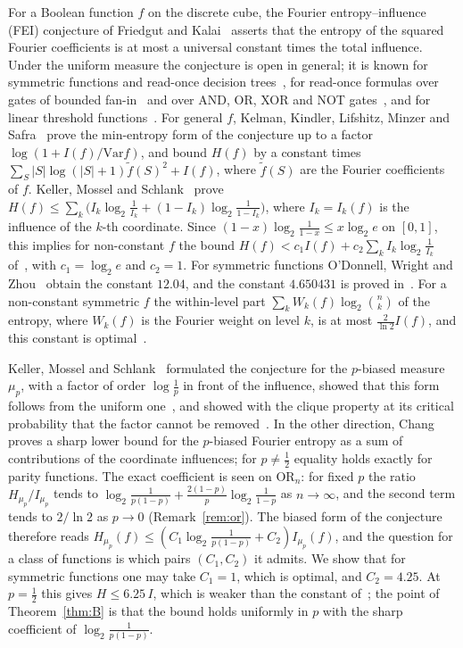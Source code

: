 \documentclass[11pt]{amsart}
\theoremstyle{remark}
\newcommand{\ft}{\tilde f}
\begin{document}
For a Boolean function $f$ on the discrete cube, the Fourier entropy--influence (FEI) conjecture of Friedgut and Kalai~\cite{FK96} asserts that the entropy of the squared Fourier coefficients is at most a universal constant times the total influence. Under the uniform measure the conjecture is open in general; it is known for symmetric functions and read-once decision trees~\cite{OWZ11}, for read-once formulas over gates of bounded fan-in~\cite{OT13} and over AND, OR, XOR and NOT gates~\cite{CKLS16}, and for linear threshold functions~\cite{Shm26lt}. For general $f$, Kelman, Kindler, Lifshitz, Minzer and Safra~\cite{KKLMS20} prove the min-entropy form of the conjecture up to a factor $\log(1 + I(f)/\mathrm{Var} f)$, and bound $H(f)$ by a constant times $\sum_S |S|\log(|S|+1)\ft(S)^2 + I(f)$, where $\ft(S)$ are the Fourier coefficients of $f$. Keller, Mossel and Schlank~\cite[Claim~4.1]{KMS12} prove $H(f) \le \sum_k \bigl(I_k\log_2\frac{1}{I_k} + (1 - I_k)\log_2\frac{1}{1 - I_k}\bigr)$, where $I_k = I_k(f)$ is the influence of the $k$-th coordinate. Since $(1 - x)\log_2\frac{1}{1 - x} \le x\log_2 e$ on $[0, 1]$, this implies for non-constant $f$ the bound $H(f) < c_1 I(f) + c_2 \sum_k I_k\log_2\frac{1}{I_k}$ of~\cite[Theorem~1]{Han25}, with $c_1 = \log_2 e$ and $c_2 = 1$. For symmetric functions O'Donnell, Wright and Zhou~\cite{OWZ11} obtain the constant $12.04$, and the constant $4.650431$ is proved in~\cite{Shm26sym}. For a non-constant symmetric $f$ the within-level part $\sum_k W_k(f)\log_2\binom{n}{k}$ of the entropy, where $W_k(f)$ is the Fourier weight on level $k$, is at most $\frac{2}{\ln 2}I(f)$, and this constant is optimal~\cite[Theorem~A]{Shm26wl}.

Keller, Mossel and Schlank~\cite{KMS12} formulated the conjecture for the $p$-biased measure $\mu_p$, with a factor of order $\log\frac{1}{p}$ in front of the influence, showed that this form follows from the uniform one~\cite[Prop.~2.1]{KMS12}, and showed with the clique property at its critical probability that the factor cannot be removed~\cite[Prop.~2.4]{KMS12}. In the other direction, Chang~\cite{Cha25} proves a sharp lower bound for the $p$-biased Fourier entropy as a sum of contributions of the coordinate influences; for $p \ne \frac12$ equality holds exactly for parity functions. The exact coefficient is seen on $\mathrm{OR}_n$: for fixed $p$ the ratio $H_{\mu_p}/I_{\mu_p}$ tends to $\log_2\frac{1}{p(1-p)} + \frac{2(1-p)}{p}\log_2\frac{1}{1-p}$ as $n \to \infty$, and the second term tends to $2/\ln 2$ as $p \to 0$ (Remark~\ref{rem:or}). The biased form of the conjecture therefore reads $H_{\mu_p}(f) \le (C_1 \log_2\frac{1}{p(1-p)} + C_2) I_{\mu_p}(f)$, and the question for a class of functions is which pairs $(C_1, C_2)$ it admits. We show that for symmetric functions one may take $C_1 = 1$, which is optimal, and $C_2 = 4.25$. At $p = \frac12$ this gives $H \le 6.25\, I$, which is weaker than the constant of~\cite{Shm26sym}; the point of Theorem~\ref{thm:B} is that the bound holds uniformly in $p$ with the sharp coefficient of $\log_2\frac{1}{p(1-p)}$.
\end{document}
